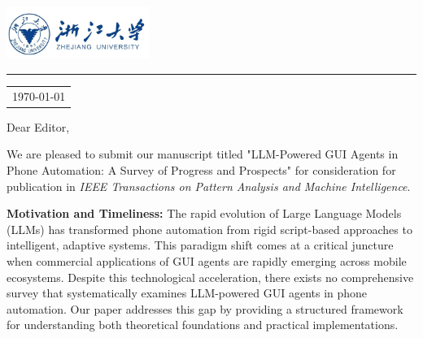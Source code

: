 \documentclass{article}
\newcommand{\journal}{IEEE Transactions on Pattern Analysis and Machine Intelligence}
\newcommand{\papertitle}{LLM-Powered GUI Agents in Phone Automation: A Survey of Progress and Prospects}
\begin{document}
\includegraphics[width=0.35\textwidth]{templete/zjulogo.png} %
\vspace{-1.5em} %
\rule{\linewidth}{1pt} %
\vspace{0.8em} %


\hfill
\begin{tabular}{l @{}}
\hfill \today \\ %
\end{tabular}

\vspace{0.5em} %


Dear Editor,

\vspace{0.5em} %


We are pleased to submit our manuscript titled "\papertitle" for consideration for publication in \textit{\journal}.

\textbf{Motivation and Timeliness:} The rapid evolution of Large Language Models (LLMs) has transformed phone automation from rigid script-based approaches to intelligent, adaptive systems. This paradigm shift comes at a critical juncture when commercial applications of GUI agents are rapidly emerging across mobile ecosystems. Despite this technological acceleration, there exists no comprehensive survey that systematically examines LLM-powered GUI agents in phone automation. Our paper addresses this gap by providing a structured framework for understanding both theoretical foundations and practical implementations.
\end{document}
